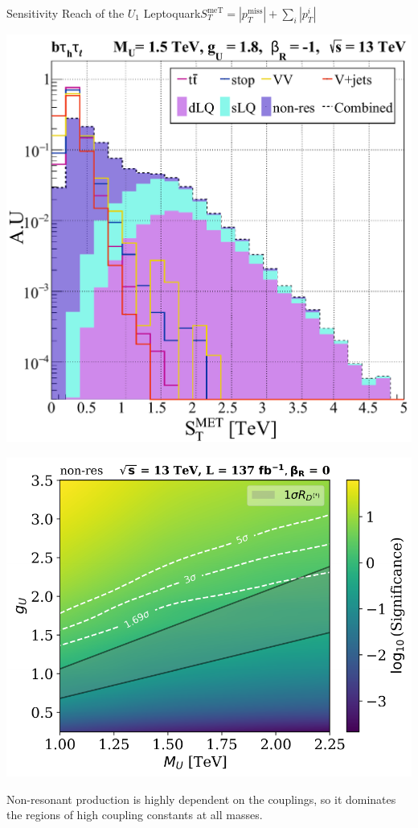 \documentclass{../bredelebeamer}
\begin{document}
\begin{frame}{Sensitivity Reach of the $U_1$ Leptoquark}{$S_T^{\text{meT}}=\left|p_{T}^{\text{miss}}\right| + \sum_i\left|p_{T}^i\right|$}
	\begin{minipage}{.48\linewidth}
			\includegraphics[width=.65\linewidth]{../2023_paper/sTTeV_semileptonic_sLQ_wRHC.pdf}

	\end{minipage}
	\begin{minipage}{.48\linewidth}
		\includegraphics[width=\linewidth]{../2023_paper/Significance_Heatmap_13TeV_L137_non-res_combined_woRHC.pdf}


	\end{minipage}

	{\large

		  Non-resonant production is highly dependent on the couplings, so it dominates the regions of high coupling constants at all masses.
	}
\end{frame}
\end{document}

